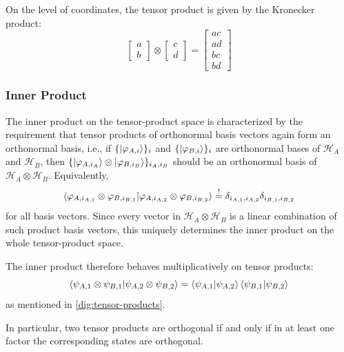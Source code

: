 On the level of coordinates, the tensor product is given by the Kronecker product:
\[
\begin{bmatrix}
a\\b
\end{bmatrix}
\otimes
\begin{bmatrix}
c\\d
\end{bmatrix}
=
\begin{bmatrix}
ac\\ad\\bc\\bd
\end{bmatrix}
\]



\subsubsection*{Inner Product}

The inner product on the tensor-product space is characterized by the requirement that tensor products of orthonormal basis vectors again form an orthonormal basis,
i.e., if
\(
\{\ket{\varphi_{A,i}}\}_i
\) and \(
\{\ket{\varphi_{B,i}}\}_i
\)
are orthonormal bases of $\mathcal H_A$ and $\mathcal H_B$, then
\(
\{\ket{\varphi_{A,i_A}}\otimes\ket{\varphi_{B,i_B}}\}_{i_A,i_B}
\)
should be  an orthonormal basis of $\mathcal H_A\otimes\mathcal H_B$.
Equivalently, 
\[
\braket{\varphi_{A,i_{A,1}} \otimes \varphi_{B,i_{B,1}} | \varphi_{A,i_{A,2}} \otimes \varphi_{B,i_{B,2}}}
\overset{!}{=}
\delta_{i_{A,1},i_{A,2}}\delta_{i_{B,1},i_{B,2}}
\]
for all basis vectors.
Since every vector in $\mathcal H_A\otimes\mathcal H_B$ is a linear combination of such product basis vectors, this uniquely determines the inner product on the whole tensor-product space.


The inner product therefore behaves multiplicatively on tensor products:
\[
\braket{\psi_{A,1} \otimes \psi_{B,1} | \psi_{A,2} \otimes \psi_{B,2}}
=
\braket{\psi_{A,1} | \psi_{A,2}}
\braket{\psi_{B,1} | \psi_{B,2}}
\]
as mentioned in \autoref{dig:tensor-products}.

\pagebreak[2]

In particular, two tensor products are orthogonal if and only if in at least one factor the corresponding states are orthogonal.

\pagebreak[3]



